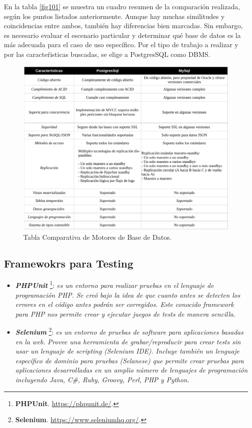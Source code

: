 \documentclass[11pt,oneside]{book}
\begin{document}
\newpage
En la tabla \eqref{fig101} se muestra un cuadro resumen de la comparación realizada, según los puntos listados anteriormente. Aunque hay muchas similitudes y coincidencias entre ambos, también hay diferencias bien marcadas. Sin embargo, es necesario evaluar el escenario particular y determinar qué base de datos es la más adecuada para el caso de uso específico. Por el tipo de trabajo a realizar y por las caracteŕisticas buscadas, se elige a PostgresSQL como DBMS.
\vspace{1cm}
\renewcommand{\figurename}{Tabla.} 
\begin{figure}[tbhp]
\centerline{\includegraphics[scale=0.8]{figs/capitulo_2_analisis/Tabla_Comparativa_DB.pdf}}
\caption{Tabla Comparativa de Motores de Base de Datos.}
\label{fig101}
\end{figure}
\renewcommand{\figurename}{Figura.}

\newpage
\subsection{Framewokrs para Testing}
\begin{itemize}
\item \textit{\textbf{PHPUnit}} \footnote{\textbf{PHPUnit}. \url{https://phpunit.de/}.}: \textit{es un entorno para realizar pruebas en el lenguaje de programación PHP. Se creó bajo la idea de que cuanto antes se detecten los errores en el código antes podrán ser corregidos. Este conocido framework para PHP nos permite crear y ejecutar juegos de tests de manera sencilla.}

\item \textit{\textbf{Selenium}} \footnote{\textbf{Selenium}. \url{https://www.seleniumhq.org/}.}: \textit{es un entorno de pruebas de software para aplicaciones basadas en la web. Provee una herramienta de grabar/reproducir para crear tests sin usar un lenguaje de scripting (Selenium IDE). Incluye también un lenguaje específico de dominio para pruebas (Selanese) que permite crear pruebas para aplicaciones desarrolladas en un amplio número de lenguajes de programación incluyendo Java, C\#, Ruby, Groovy, Perl, PHP y Python.}
\end{itemize}
\end{document}
